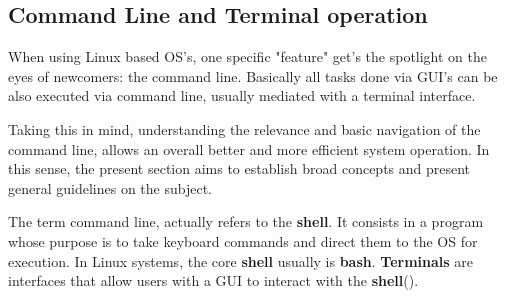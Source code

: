 \documentclass[a4paper,11pt]{article}
\begin{document}
\subsection{Command Line and Terminal operation}
When using Linux based OS's, one specific "feature" get's the spotlight on the
eyes of newcomers: the command line. Basically all tasks done via GUI's can be
also executed via command line, usually mediated with a terminal interface.\par
Taking this in mind, understanding the relevance and basic navigation of the
command line, allows an overall better and more efficient system operation. In
this sense, the present section aims to establish broad concepts and present
general guidelines on the subject.
\begin{definitionbox}
    The term command line, actually refers to the \textbf{shell}. It consists in
    a program whose purpose is to take keyboard commands and direct them to the
    OS for execution. In Linux systems, the core \textbf{shell} usually is
    \textbf{bash}. \textbf{Terminals} are interfaces that allow users with a GUI to
    interact with the \textbf{shell}(\cite{shottsLinuxCommandLine2024}).
\end{definitionbox}
\end{document}
